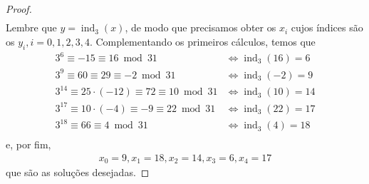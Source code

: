\documentclass[a4paper,12pt]{article}
\DeclareMathOperator{\ind}{ind}
\theoremstyle{definition}
\begin{document}
\begin{proof}
\begin{align*}
		\end{align*}
		Lembre que $y = \ind_3(x)$, de modo que precisamos obter os $x_i$ cujos índices são os $y_i, i = 0,1,2,3,4$. Complementando os primeiros cálculos, temos que
		\begin{align*}
		3^6 \equiv -15 \equiv 16\bmod 31 &\Longleftrightarrow \ind_3(16) = 6 \\
		3^9 \equiv 60 \equiv 29 \equiv -2\bmod 31 &\Longleftrightarrow \ind_3(-2) = 9 \\
		3^{14} \equiv 25\cdot (-12) \equiv 72 \equiv 10\bmod 31 &\Longleftrightarrow \ind_3(10) = 14 \\
		3^{17} \equiv 10\cdot(-4) \equiv -9 \equiv 22\bmod 31 &\Longleftrightarrow \ind_3(22) = 17 \\
		3^{18} \equiv 66 \equiv 4 \bmod 31 &\Longleftrightarrow \ind_3(4) = 18 \\
		\end{align*}
		e, por fim,
		\begin{align*}
		x_0 = 9, x_1 = 18, x_2 = 14, x_3 = 6, x_4 = 17
		\end{align*}
		que são as soluções desejadas.
	\end{proof}
\end{document}
